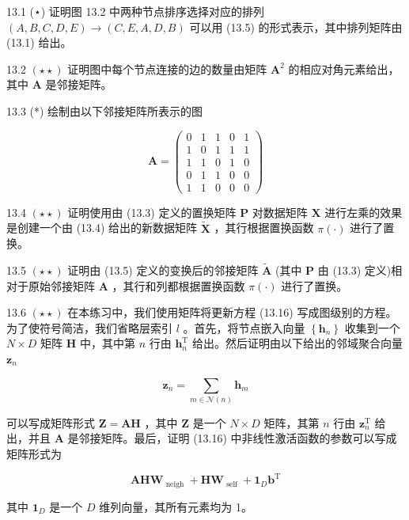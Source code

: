 \documentclass[10pt]{report}
\begin{document}
13.1 (⋆) 证明图 13.2 中两种节点排序选择对应的排列 \(\left( {A,B,C,D,E}\right)  \rightarrow  \left( {C,E,A,D,B}\right)\) 可以用 (13.5) 的形式表示，其中排列矩阵由 (13.1) 给出。

13.2 \(\left( {\star  \star  }\right)\) 证明图中每个节点连接的边的数量由矩阵 \({\mathbf{A}}^{2}\) 的相应对角元素给出，其中 \(\mathbf{A}\) 是邻接矩阵。

13.3 (*) 绘制由以下邻接矩阵所表示的图

\[
\mathbf{A} = \left( \begin{array}{lllll} 0 & 1 & 1 & 0 & 1 \\  1 & 0 & 1 & 1 & 1 \\  1 & 1 & 0 & 1 & 0 \\  0 & 1 & 1 & 0 & 0 \\  1 & 1 & 0 & 0 & 0 \end{array}\right)  \tag{13.42}
\]

13.4 \(\left( {\star  \star  }\right)\) 证明使用由 (13.3) 定义的置换矩阵 \(\mathbf{P}\) 对数据矩阵 \(\mathbf{X}\) 进行左乘的效果是创建一个由 (13.4) 给出的新数据矩阵 \(\widetilde{\mathbf{X}}\) ，其行根据置换函数 \(\pi \left( \cdot \right)\) 进行了置换。

13.5 \(\left( {\star  \star  }\right)\) 证明由 (13.5) 定义的变换后的邻接矩阵 \(\widetilde{\mathbf{A}}\) (其中 \(\mathbf{P}\) 由 (13.3) 定义)相对于原始邻接矩阵 \(\mathbf{A}\) ，其行和列都根据置换函数 \(\pi \left( \cdot \right)\) 进行了置换。

13.6 \(\left( {\star  \star  }\right)\) 在本练习中，我们使用矩阵将更新方程 (13.16) 写成图级别的方程。为了使符号简洁，我们省略层索引 \(l\) 。首先，将节点嵌入向量 \(\left\{  {\mathbf{h}}_{n}\right\}\) 收集到一个 \(N \times  D\) 矩阵 \(\mathbf{H}\) 中，其中第 \(n\) 行由 \({\mathbf{h}}_{n}^{\mathrm{T}}\) 给出。然后证明由以下给出的邻域聚合向量 \({\mathbf{z}}_{n}\)

\[
{\mathbf{z}}_{n} = \mathop{\sum }\limits_{{m \in  \mathcal{N}\left( n\right) }}{\mathbf{h}}_{m} \tag{13.43}
\]

可以写成矩阵形式 \(\mathbf{Z} = \mathbf{{AH}}\) ，其中 \(\mathbf{Z}\) 是一个 \(N \times  D\) 矩阵，其第 \(n\) 行由 \({\mathbf{z}}_{n}^{\mathrm{T}}\) 给出，并且 \(\mathbf{A}\) 是邻接矩阵。最后，证明 (13.16) 中非线性激活函数的参数可以写成矩阵形式为

\[
{\mathbf{{AHW}}}_{\text{ neigh }} + {\mathbf{{HW}}}_{\text{ self }} + {\mathbf{1}}_{D}{\mathbf{b}}^{\mathrm{T}} \tag{13.44}
\]

其中 \({\mathbf{1}}_{D}\) 是一个 \(D\) 维列向量，其所有元素均为 1。
\end{document}
